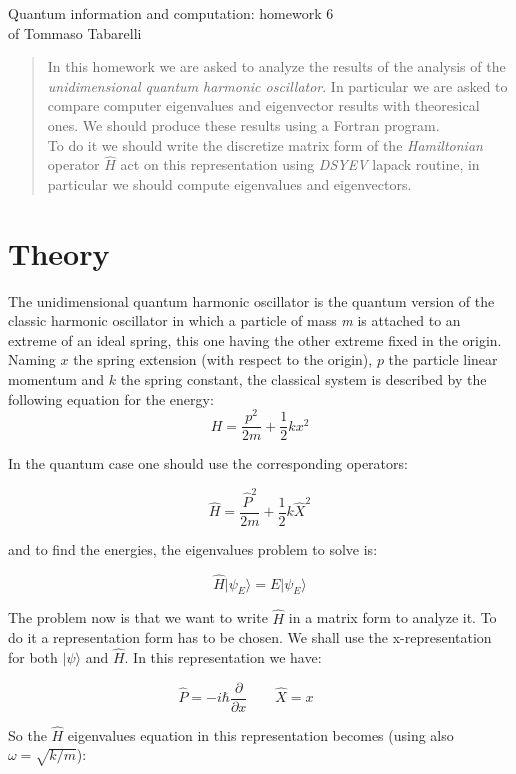 \documentclass[12pt, a4paper, notitlepage]{report}
\begin{document}
\begin{center}
	\LARGE{Quantum information and computation: homework 6}\\
	\Large{of Tommaso Tabarelli}
\end{center}


\begin{abstract}
	In this homework we are asked to analyze the results of the analysis of the \textit{unidimensional quantum harmonic oscillator}. In particular we are asked to compare computer eigenvalues and eigenvector results with theoresical ones. We should produce these results using a Fortran program.\\
	To do it we should write the discretize matrix form of the \textit{Hamiltonian} operator $\hat{H}$ act on this representation using \textit{DSYEV} lapack routine, in particular we should compute eigenvalues and eigenvectors.
\end{abstract}

\section*{Theory}
The unidimensional quantum harmonic oscillator is the quantum version of the classic harmonic oscillator in which a particle of mass \textit{m} is attached to an extreme of an ideal spring, this one having the other extreme fixed in the origin.\\
Naming $x$ the spring extension (with respect to the origin), $p$ the particle linear momentum and $k$ the spring constant, the classical system is described by the following equation for the energy:
$$ H = \frac{p^2}{2m} + \frac{1}{2} k x^2 $$

In the quantum case one should use the corresponding operators:

$$ \hat{H} = \frac{\hat{P}^2}{2m} + \frac{1}{2} k \hat{X}^2 $$

and to find the energies, the eigenvalues problem to solve is:

$$ \hat{H} \vert \psi_E \rangle = E \vert \psi_E \rangle $$

The problem now is that we want to write $\hat{H}$ in a matrix form to analyze it. To do it a representation form has to be chosen. We shall use the x-representation for both $ \vert \psi \rangle $ and $ \hat{H} $. In this representation we have:

$$ \hat{P} = -i \hbar \frac{ \partial }{ \partial x} \qquad \hat{X} = x \qquad  $$

So the $\hat{H}$ eigenvalues equation in this representation becomes (using also $\omega = \sqrt{k/m}$):
\end{document}
